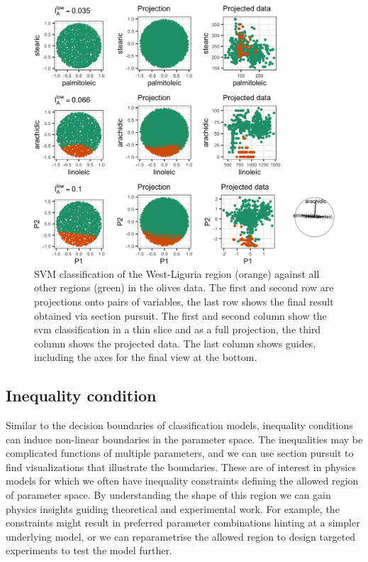 \documentclass[]{interact}
\theoremstyle{plain}%
\theoremstyle{definition}
\theoremstyle{remark}
\begin{document}
\begin{figure}
\includegraphics[width=1\linewidth]{section_pursuit_files/figure-latex/olives-1} \caption{SVM classification of the West-Liguria region (orange) against all other regions (green) in the olives data. The first and second row are projections onto pairs of variables, the last row shows the final result obtained via section pursuit. The first and second column show the svm classification in a thin slice and as a full projection, the third column shows the projected data. The last column shows guides, including the axes for the final view at the bottom.}\label{fig:olives}
\end{figure}

\hypertarget{inequality-condition}{%
\subsection{Inequality condition}\label{inequality-condition}}

Similar to the decision boundaries of classification models, inequality
conditions can induce non-linear boundaries in the parameter space. The
inequalities may be complicated functions of multiple parameters, and we
can use section pursuit to find visualizations that illustrate the
boundaries. These are of interest in physics models for which we often
have inequality constraints defining the allowed region of parameter
space. By understanding the shape of this region we can gain physics
insights guiding theoretical and experimental work. For example, the
constraints might result in preferred parameter combinations hinting at
a simpler underlying model, or we can reparametrise the allowed region
to design targeted experiments to test the model further.
\end{document}
